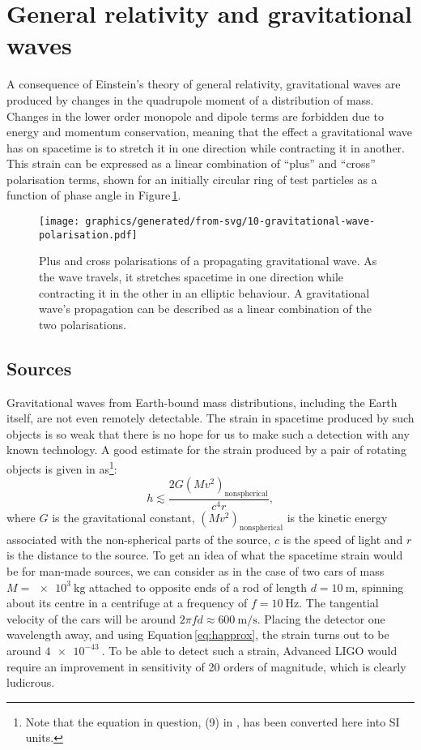 \section{General relativity and gravitational waves}
A consequence of Einstein's theory of general relativity, gravitational waves are produced by changes in the quadrupole moment of a distribution of mass. Changes in the lower order monopole and dipole terms are forbidden due to energy and momentum conservation, meaning that the effect a gravitational wave has on spacetime is to stretch it in one direction while contracting it in another. This strain can be expressed as a linear combination of ``plus'' and ``cross'' polarisation terms, shown for an initially circular ring of test particles as a function of phase angle in Figure\,\ref{fig:gravitational-wave-polarisation}.

\begin{figure}
  \centering
  \texttt{[image: graphics/generated/from-svg/10-gravitational-wave-polarisation.pdf]}
  \caption{\label{fig:gravitational-wave-polarisation}Plus and cross polarisations of a propagating gravitational wave. As the wave travels, it stretches spacetime in one direction while contracting it in the other in an elliptic behaviour. A gravitational wave's propagation can be described as a linear combination of the two polarisations.}
\end{figure}

\subsection{Sources}
Gravitational waves from Earth-bound mass distributions, including the Earth itself, are not even remotely detectable. The strain in spacetime produced by such objects is so weak that there is no hope for us to make such a detection with any known technology. A good estimate for the strain produced by a pair of rotating objects is given in \cite{Sathyaprakash2009} as\footnote{Note that the equation in question, (9) in \cite{Sathyaprakash2009}, has been converted here into SI units.}:
\begin{equation}
  \label{eq:happrox}
  h \lesssim \frac{2 G \left( M v^{2} \right)_{\text{nonspherical}}}{c^4 r},
\end{equation}
where $G$ is the gravitational constant, $\left( M v^{2} \right)_{\text{nonspherical}}$ is the kinetic energy associated with the non-spherical parts of the source, $c$ is the speed of light and $r$ is the distance to the source. To get an idea of what the spacetime strain would be for man-made sources, we can consider as in \cite{Sathyaprakash2009} the case of two cars of mass $M = \SI{e3}{\kilo\gram}$ attached to opposite ends of a rod of length $d = \SI{10}{\meter}$, spinning about its centre in a centrifuge at a frequency of $f = \SI{10}{\hertz}$. The tangential velocity of the cars will be around $2 \pi f d \approx \SI{600}{\meter\per\second}$. Placing the detector one wavelength away, and using Equation\,\ref{eq:happrox}, the strain turns out to be around $\SI{4e-43}{}$. To be able to detect such a strain, Advanced LIGO would require an improvement in sensitivity of \SI{20}{} orders of magnitude, which is clearly ludicrous.

